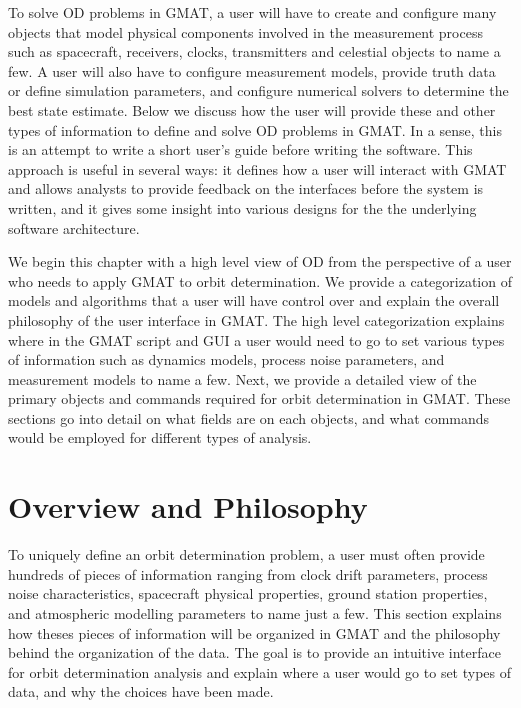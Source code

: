 
To solve OD problems in GMAT, a user will have to create and
configure many objects that model physical components involved in
the measurement process such as spacecraft, receivers, clocks,
transmitters and celestial objects to name a few.  A user will also
have to configure measurement models, provide truth data or define
simulation parameters, and configure numerical solvers to determine
the best state estimate. Below we discuss how the user will provide
these and other types of information to define and solve OD problems
in GMAT.  In a sense, this is an attempt to write a short user's
guide  before writing the software.  This approach is useful in
several ways: it defines how a user will interact with GMAT and
allows analysts to provide feedback on the interfaces before the
system is written, and it gives some insight into various designs
for the the underlying software architecture.

We begin this chapter with a high level view of OD from the
perspective of a user who needs to apply GMAT to orbit
determination. We provide a categorization of models and algorithms
that a user will have control over and explain the overall
philosophy of the user interface in GMAT.  The high level
categorization explains where in the GMAT script and GUI a user
would need to go to set various types of information such as
dynamics models, process noise parameters, and measurement models to
name a few.  Next, we provide a detailed view of the primary objects
and commands required for orbit determination in GMAT.  These
sections go into detail on what fields are on each objects, and what
commands would be employed for different types of analysis.

\section{Overview and Philosophy}

To uniquely define an orbit determination problem, a user must often
provide hundreds of pieces of information ranging from clock drift
parameters, process noise characteristics, spacecraft physical
properties, ground station properties, and atmospheric modelling
parameters to name just a few. This section explains how theses
pieces of information will be organized in GMAT and the philosophy
behind the organization of the data.  The goal is to provide an
intuitive interface for orbit determination analysis and explain
where a user would go to set types of data, and why the choices have
been made. 

